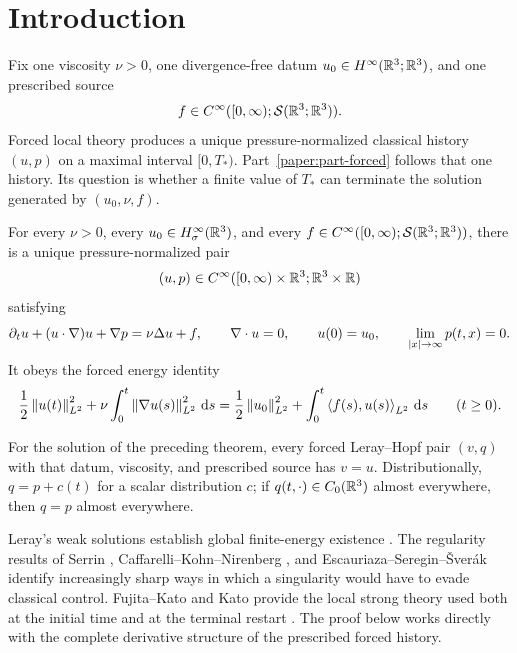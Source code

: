 \section{Introduction}
\label{f:sec:introduction}

Fix one viscosity \(\nu>0\), one divergence-free datum
\(u_0\in H^\infty(\mathbb R^3;\mathbb R^3)\), and one prescribed source
\[
 f\in C^\infty([0,\infty);\mathcal S(\mathbb R^3;\mathbb R^3)).
\]
Forced local theory produces a unique pressure-normalized classical history
\((u,p)\) on a maximal interval \([0,T_*)\). Part~\ref{paper:part-forced} follows that one
history. Its question is whether a finite value of \(T_*\) can terminate the
solution generated by \((u_0,\nu,f)\).

\begin{maintheorem}
\label{f:thm:main-global}
For every \(\nu>0\), every \(u_0\in H^\infty_\sigma(\mathbb R^3)\), and every
\(f\in C^\infty([0,\infty);\mathcal S(\mathbb R^3;\mathbb R^3))\), there is a unique
pressure-normalized pair
\[
 (u,p)\in C^\infty([0,\infty)\times\mathbb R^3;\mathbb R^3\times\mathbb R)
\]
satisfying
\[
 \partial_tu+(u\cdot\nabla)u+\nabla p=\nu\Delta u+f,
 \qquad \nabla\cdot u=0,
 \qquad u(0)=u_0,
 \qquad \lim_{\left|x\right|\to\infty}p(t,x)=0.
\]
It obeys the forced energy identity
\[
 \frac12\left\lVert u(t)\right\rVert_{L^2}^2
 +\nu\int_0^t\left\lVert \nabla u(s)\right\rVert_{L^2}^2\,\mathrm d s
 =\frac12\left\lVert u_0\right\rVert_{L^2}^2
 +\int_0^t\left\langle f(s),u(s)\right\rangle_{L^2}\,\mathrm d s
 \qquad(t\ge0).
\]
\end{maintheorem}

\begin{corollary}
\label{f:cor:main-weak-strong}
For the solution of the preceding theorem, every forced Leray--Hopf pair
\((v,q)\) with that datum, viscosity, and
prescribed source has \(v=u\). Distributionally,
\(q=p+c(t)\) for a scalar distribution \(c\); if
\(q(t,\cdot)\in C_0(\mathbb R^3)\) almost everywhere, then \(q=p\) almost
everywhere.
\end{corollary}

Leray's weak solutions establish global finite-energy existence
\cite{Leray1934}. The regularity results of Serrin
\cite{Serrin1962}, Caffarelli--Kohn--Nirenberg \cite{CKN1982}, and
Escauriaza--Seregin--\v{S}ver\'ak \cite{ESS2003} identify increasingly sharp
ways in which a singularity would have to evade classical control.
Fujita--Kato and Kato provide the local strong theory used both at the
initial time and at the terminal restart \cite{FujitaKato1964,Kato1984}.
The proof below works directly with the complete derivative structure of the
prescribed forced history.

